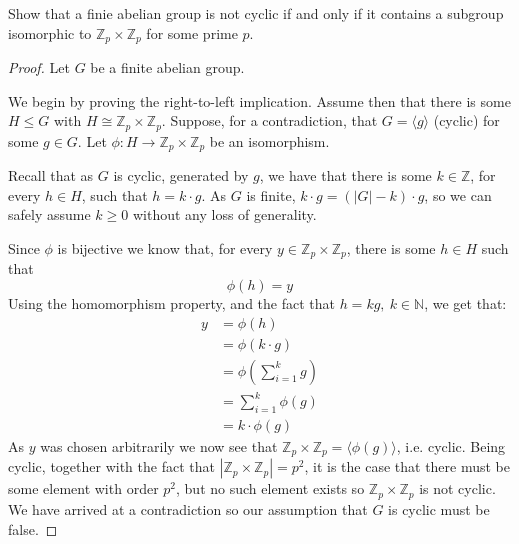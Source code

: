 \begin{prob}
    Show that a finie abelian group is not cyclic if and only 
    if it contains a subgroup isomorphic to $\mathbb Z_p 
    \times \mathbb Z_p$ for some prime $p$.
\end{prob}
\begin{proof}
    Let $G$ be a finite abelian group. 

    We begin by proving the right-to-left implication. 
    Assume then that there is some $H \leq G$ with 
    $H \cong \mathbb Z_p \times \mathbb Z_p$. 
    Suppose, for a contradiction, 
    that $G = \langle g \rangle$ (cyclic) for some $g \in G$.
    Let $\phi : H \to \mathbb Z_p \times \mathbb Z_p$ be an 
    isomorphism. 

    Recall that as $G$ is cyclic, generated by $g$, we have that  
    there is some $k \in \mathbb Z$, for every $h \in H$, 
    such that $h = k\cdot g$. As $G$ is finite, $k \cdot g = 
    (|G| - k) \cdot g$, so we can safely assume $k \geq 0$ without 
    any loss of generality. 

    Since $\phi$ is bijective we know that, for every  
    $y \in \mathbb Z_p \times \mathbb Z_p$, there is some 
    $h \in H$ such that 
    \[
        \phi(h) = y
    \]
    Using the homomorphism property, and the 
    fact that $h = kg, \ k \in \mathbb N$, we get that: 
    \begin{align*}
        y &= \phi(h) \\ 
          &= \phi(k\cdot g) \\ 
          &= \phi\left(\displaystyle\sum_{i=1}^{k}g\right) \\ 
          &= \displaystyle\sum_{i=1}^{k} \phi(g) \\ 
          &= k \cdot \phi(g)
    \end{align*}
    As $y$ was chosen arbitrarily we now see that 
    $\mathbb Z_p \times \mathbb Z_p = \langle \phi(g) \rangle$, i.e. 
    cyclic. Being cyclic, together with the fact that 
    $|\mathbb Z_p \times \mathbb Z_p| = p^2$, it is the 
    case that there must be some element with order 
    $p^2$, but no such element exists so $\mathbb Z_p \times 
    \mathbb Z_p$ is not cyclic. We have arrived at a contradiction 
    so our assumption that $G$ is cyclic must be false. 


\end{proof}
